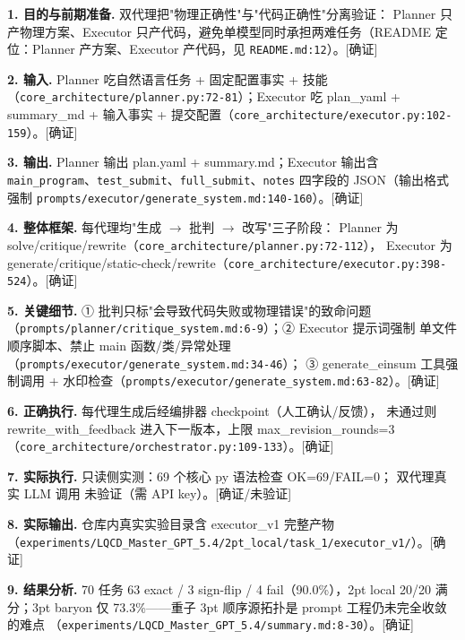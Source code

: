 \documentclass[UTF8]{ctexart}
\begin{document}
\noindent\textbf{1. 目的与前期准备.} 双代理把"物理正确性"与"代码正确性"分离验证：
Planner 只产物理方案、Executor 只产代码，避免单模型同时承担两难任务（README
定位：Planner 产方案、Executor 产代码，见 \texttt{\nolinkurl{README.md:12}}）。[确证]

\noindent\textbf{2. 输入.} Planner 吃自然语言任务 + 固定配置事实 + 技能
（\texttt{\nolinkurl{core_architecture/planner.py:72-81}}）；Executor 吃 plan\_yaml +
summary\_md + 输入事实 + 提交配置（\texttt{\nolinkurl{core_architecture/executor.py:102-159}}）。[确证]

\noindent\textbf{3. 输出.} Planner 输出 plan.yaml + summary.md；Executor 输出含
\texttt{main\_program}、\texttt{test\_submit}、\texttt{full\_submit}、\texttt{notes}
四字段的 JSON（输出格式强制 \texttt{\nolinkurl{prompts/executor/generate_system.md:140-160}}）。[确证]

\noindent\textbf{4. 整体框架.} 每代理均"生成 $\rightarrow$ 批判 $\rightarrow$ 改写"三子阶段：
Planner 为 solve/critique/rewrite（\texttt{\nolinkurl{core_architecture/planner.py:72-112}}），
Executor 为 generate/critique/static-check/rewrite（\texttt{\nolinkurl{core_architecture/executor.py:398-524}}）。[确证]

\noindent\textbf{5. 关键细节.} ① 批判只标"会导致代码失败或物理错误"的致命问题
（\texttt{\nolinkurl{prompts/planner/critique_system.md:6-9}}）；② Executor 提示词强制
单文件顺序脚本、禁止 main 函数/类/异常处理（\texttt{\nolinkurl{prompts/executor/generate_system.md:34-46}}）；
③ generate\_einsum 工具强制调用 + 水印检查（\texttt{\nolinkurl{prompts/executor/generate_system.md:63-82}}）。[确证]

\noindent\textbf{6. 正确执行.} 每代理生成后经编排器 checkpoint（人工确认/反馈），
未通过则 rewrite\_with\_feedback 进入下一版本，上限 max\_revision\_rounds=3
（\texttt{\nolinkurl{core_architecture/orchestrator.py:109-133}}）。[确证]

\noindent\textbf{7. 实际执行.} 只读侧实测：69 个核心 py 语法检查 OK=69/FAIL=0；
双代理真实 LLM 调用 \textcolor{warn}{未验证}（需 API key）。[确证/未验证]

\noindent\textbf{8. 实际输出.} 仓库内真实实验目录含 executor\_v1 完整产物
（\texttt{\nolinkurl{experiments/LQCD_Master_GPT_5.4/2pt_local/task_1/executor_v1/}}）。[确证]

\noindent\textbf{9. 结果分析.} 70 任务 63 exact / 3 sign-flip / 4 fail（90.0\%），2pt local
20/20 满分；3pt baryon 仅 73.3\%——重子 3pt 顺序源拓扑是 prompt 工程仍未完全收敛的难点
（\texttt{\nolinkurl{experiments/LQCD_Master_GPT_5.4/summary.md:8-30}}）。[确证]
\end{document}
